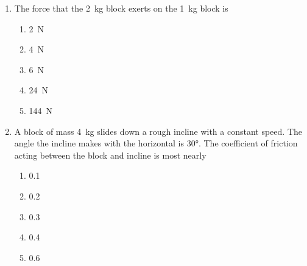 \documentclass{../../../oss-apphys}
\begin{document}
\begin{multicols}{2}
\begin{enumerate}[resume,leftmargin=18pt]
  \item The force that the \SI{2}{\kilo\gram} block exerts on the
    \SI{1}{\kilo\gram} block is
    \begin{enumerate}[nosep,leftmargin=18pt,label=(\Alph*)]
    \item\SI{2}{\newton}
    \item\SI{4}{\newton}
    \item\SI{6}{\newton}
    \item\SI{24}{\newton}
    \item\SI{144}{\newton}
    \end{enumerate}
    \label{3blks2}
    
    
  \item A block of mass \SI{4}{\kilo\gram} slides down a rough incline with a
    constant speed. The angle the incline makes with the horizontal is
    \ang{30}. The coefficient of friction acting between the block and incline
    is most nearly
    
    \begin{enumerate}[nosep,leftmargin=18pt,label=(\Alph*)]
    \item 0.1
    \item 0.2
    \item 0.3
    \item 0.4
    \item 0.6
    \end{enumerate}
    \columnbreak
    

\end{enumerate}
\end{multicols}
\end{document}

